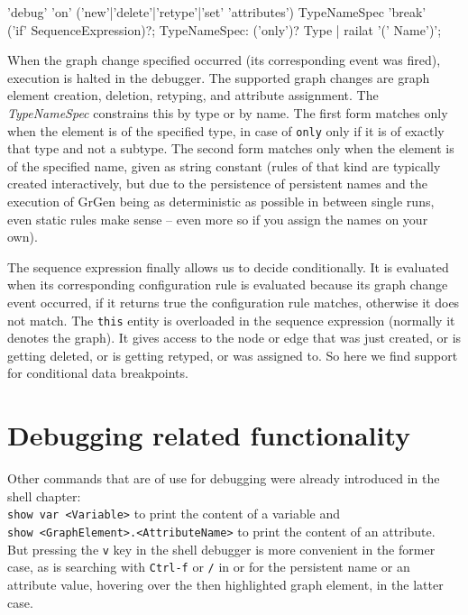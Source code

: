 \begin{rail}
  'debug' 'on' ('new'|'delete'|'retype'|'set' 'attributes') TypeNameSpec 'break' \\ ('if' SequenceExpression)?;
	TypeNameSpec: ('only')? Type | railat '(' Name')';
\end{rail}

When the graph change specified occurred (its corresponding event was fired), execution is halted in the debugger.
The supported graph changes are graph element creation, deletion, retyping, and attribute assignment.
The \emph{TypeNameSpec} constrains this by type or by name.
The first form matches only when the element is of the specified type, in case of \texttt{only} only if it is of exactly that type and not a subtype.
The second form matches only when the element is of the specified name, given as string constant 
(rules of that kind are typically created interactively, but due to the persistence of persistent names and the execution of GrGen being as deterministic as possible in between single runs, even static rules make sense -- even more so if you assign the names on your own).

The sequence expression finally allows us to decide conditionally.
It is evaluated when its corresponding configuration rule is evaluated because its graph change event occurred, if it returns true the configuration rule matches, otherwise it does not match.
The \texttt{this} entity is overloaded in the sequence expression (normally it denotes the graph).
It gives access to the node or edge that was just created, or is getting deleted, or is getting retyped, or was assigned to.
So here we find support for conditional data breakpoints.


\section{Debugging related functionality}

Other commands that are of use for debugging were already introduced in the shell chapter:\\
\verb#show var <Variable># to print the content of a variable and \\
\verb#show <GraphElement>.<AttributeName># to print the content of an attribute.\\
But pressing the \texttt{v} key in the shell debugger is more convenient in the former case, as is searching with \texttt{Ctrl-f} or \texttt{/} in \yComp{} or \MSAGLExt{} for the persistent name or an attribute value, hovering over the then highlighted graph element, in the latter case.

